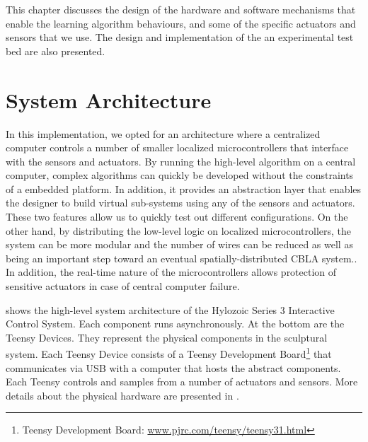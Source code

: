 This chapter discusses the design of the hardware and software mechanisms that enable the learning algorithm behaviours, and some of the specific actuators and sensors that we use. The design and implementation of the an experimental test bed are also presented. 


\section{System Architecture}

In this implementation, we opted for an architecture where a centralized computer controls a number of smaller localized microcontrollers that interface with the sensors and actuators. By running the high-level algorithm on a central computer, complex algorithms can quickly be developed without the constraints of a embedded platform. In addition, it provides an abstraction layer that enables the designer to build virtual sub-systems using any of the sensors and actuators. These two features allow us to quickly test out different configurations. On the other hand, by distributing the low-level logic on localized microcontrollers, the system can be more modular and the number of wires can be reduced as well as being an important step toward an eventual spatially-distributed CBLA system.. In addition, the real-time nature of the microcontrollers allows protection of sensitive actuators in case of central computer failure. 

 shows the high-level system architecture of the Hylozoic Series 3 Interactive Control System. Each component runs asynchronously. At the bottom are the Teensy Devices. They represent the physical components in the sculptural system. Each Teensy Device consists of a Teensy Development Board\footnote{Teensy Development Board: \url{www.pjrc.com/teensy/teensy31.html}} that communicates via USB with a computer that hosts the abstract components. Each Teensy controls and samples from a number of actuators and sensors. More details about the physical hardware are presented in . 

